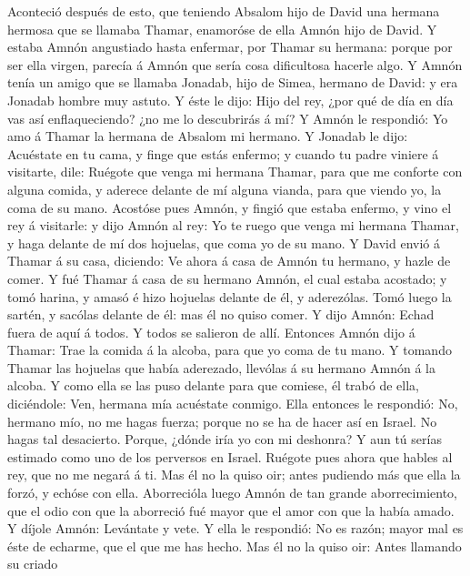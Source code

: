  Aconteció después de esto, que teniendo Absalom hijo de
David una hermana hermosa que se llamaba Thamar, enamoróse de ella Amnón
hijo de David.  Y estaba Amnón angustiado hasta enfermar,
por Thamar su hermana: porque por ser ella virgen, parecía á Amnón que
sería cosa dificultosa hacerle algo.  Y Amnón tenía un
amigo que se llamaba Jonadab, hijo de Simea, hermano de David: y era
Jonadab hombre muy astuto.  Y éste le dijo: Hijo del rey,
¿por qué de día en día vas así enflaqueciendo? ¿no me lo descubrirás á
mí? Y Amnón le respondió: Yo amo á Thamar la hermana de Absalom mi
hermano.  Y Jonadab le dijo: Acuéstate en tu cama, y finge
que estás enfermo; y cuando tu padre viniere á visitarte, dile: Ruégote
que venga mi hermana Thamar, para que me conforte con alguna comida, y
aderece delante de mí alguna vianda, para que viendo yo, la coma de su
mano.  Acostóse pues Amnón, y fingió que estaba enfermo, y
vino el rey á visitarle: y dijo Amnón al rey: Yo te ruego que venga mi
hermana Thamar, y haga delante de mí dos hojuelas, que coma yo de su
mano.  Y David envió á Thamar á su casa, diciendo: Ve
ahora á casa de Amnón tu hermano, y hazle de comer.  Y fué
Thamar á casa de su hermano Amnón, el cual estaba acostado; y tomó
harina, y amasó é hizo hojuelas delante de él, y aderezólas.
 Tomó luego la sartén, y sacólas delante de él: mas él no
quiso comer. Y dijo Amnón: Echad fuera de aquí á todos. Y todos se
salieron de allí.  Entonces Amnón dijo á Thamar: Trae la
comida á la alcoba, para que yo coma de tu mano. Y tomando Thamar las
hojuelas que había aderezado, llevólas á su hermano Amnón á la alcoba.
 Y como ella se las puso delante para que comiese, él
trabó de ella, diciéndole: Ven, hermana mía acuéstate conmigo.
 Ella entonces le respondió: No, hermano mío, no me hagas
fuerza; porque no se ha de hacer así en Israel. No hagas tal desacierto.
 Porque, ¿dónde iría yo con mi deshonra? Y aun tú serías
estimado como uno de los perversos en Israel. Ruégote pues ahora que
hables al rey, que no me negará á ti.  Mas él no la quiso
oir; antes pudiendo más que ella la forzó, y echóse con ella.
 Aborrecióla luego Amnón de tan grande aborrecimiento,
que el odio con que la aborreció fué mayor que el amor con que la había
amado. Y díjole Amnón: Levántate y vete.  Y ella le
respondió: No es razón; mayor mal es éste de echarme, que el que me has
hecho. Mas él no la quiso oir:  Antes llamando su criado
